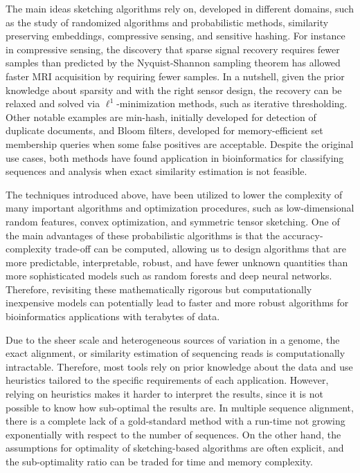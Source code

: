 
The main ideas sketching algorithms rely on,     developed in different domains, such as the study of randomized algorithms and probabilistic methods, similarity preserving embeddings, compressive sensing, and sensitive hashing. For instance in compressive sensing, the discovery that sparse signal recovery requires fewer samples than predicted by the Nyquist-Shannon sampling theorem has allowed faster MRI acquisition by requiring fewer samples. In a nutshell, given the prior knowledge about sparsity and with the right sensor design, the recovery can be relaxed and solved via $\ell^1$-minimization methods, such as iterative thresholding. Other notable examples are min-hash, initially developed for detection of duplicate documents, and Bloom filters, developed for memory-efficient set membership queries when some false positives are acceptable. Despite the original use cases, both methods have found application in bioinformatics for classifying sequences and analysis when exact similarity estimation is not feasible. 


The techniques introduced above, have been utilized to lower the complexity of many important algorithms and optimization procedures, such as low-dimensional random features, convex optimization, and symmetric tensor sketching.
One of the main advantages of these probabilistic algorithms is that the accuracy-complexity trade-off can be computed, allowing us to design algorithms that are more predictable, interpretable, robust, and have fewer unknown quantities than more sophisticated models such as random forests and deep neural networks. 
Therefore, revisiting these mathematically rigorous but computationally inexpensive models can potentially lead to faster and more robust algorithms for bioinformatics applications with terabytes of data.



Due to the sheer scale and heterogeneous sources of variation in a genome, the exact alignment, or similarity estimation of sequencing reads is computationally intractable. Therefore, most tools rely on prior knowledge about the data and use heuristics tailored to the specific requirements of each application. 
However, relying on heuristics makes it harder to interpret the results, since it is not possible to know how sub-optimal the results are. 
In multiple sequence alignment, there is a complete lack of a gold-standard method with a run-time not growing exponentially with respect to the number of sequences. On the other hand, the assumptions for optimality of sketching-based algorithms are often explicit, and the sub-optimality ratio can be traded for time and memory complexity. 



